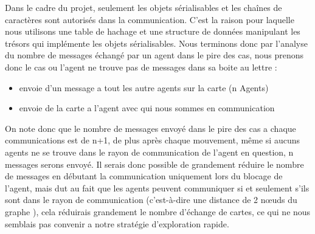 \documentclass[10pt]{article}
\newcommand\tab[1][0.65cm]{\hspace*{#1}}
\begin{document}
\tab Dans le cadre du projet, seulement les objets sérialisables et les chaînes de caractères sont autorisés dans la communication. C'est la raison pour laquelle nous utilisons une table de hachage et une structure de données manipulant les trésors qui implémente les objets sérialisables. Nous terminons donc par l'analyse du nombre de messages échangé par un agent dans le pire des cas, nous prenons donc le cas ou l'agent ne trouve pas de messages dans sa boite au lettre : 
\begin{itemize}
  \item envoie d'un message a tout les autre agents sur la carte (n Agents)
  \item envoie de la carte a l'agent avec qui nous sommes en communication
\end{itemize}
On note donc que le nombre de messages envoyé dans le pire des cas a chaque communications est de n+1, de plus après chaque mouvement, même si aucuns agents ne se trouve dans le rayon de communication de l'agent en question, n messages serons envoyé. Il serais donc possible de grandement réduire le nombre de messages en débutant la communication uniquement lors du blocage de l'agent, mais dut au fait que les agents peuvent communiquer si et seulement s'ils sont dans le rayon de communication (c'est-à-dire une distance de 2 nœuds du graphe ), cela réduirais grandement le nombre d'échange de cartes, ce qui ne nous semblais pas convenir a notre stratégie d'exploration rapide. 
\end{document}
